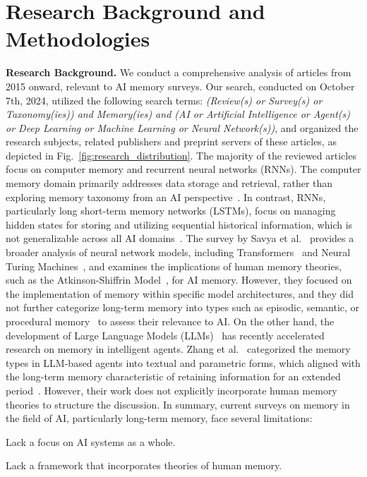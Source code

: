 \documentclass[journal,hideappendix]{vgtc}
\newenvironment{j_itemize}{
\begin{itemize}[]
  \setlength{\itemsep}{3pt}
  \setlength{\parskip}{0pt}
  \setlength{\parsep}{0pt}
}{\end{itemize}}
\begin{document}
\section{Research Background and Methodologies}
\label{sec:survey_ltm_ai}

\textbf{Research Background.} We conduct a comprehensive analysis of articles from 2015 onward, relevant to AI memory surveys. Our search, conducted on October 7th, 2024, utilized the following search terms: \textit{(Review(s) or Survey(s) or Taxonomy(ies)) and Memory(ies) and (AI or Artificial Intelligence or Agent(s) or Deep Learning or Machine Learning or Neural Network(s))}, and organized the research subjects, related publishers and preprint servers of these articles, as depicted in Fig.~\ref{fig:research_distribution}. The majority of the reviewed articles focus on computer memory and recurrent neural networks (RNNs). The computer memory domain primarily addresses data storage and retrieval, rather than exploring memory taxonomy from an AI perspective~\cite{mittal2018survey,umesh2019survey,vurdelja2020survey,radanliev2021review,qian2021graph,asad2022survey,chen2022resistive,haensch2023compute,snasel2023review,ulidowski2023saving,radhika2023review,kaur2024comprehensive,alaparthi2024survey}. In contrast, RNNs, particularly long short-term memory networks (LSTMs), focus on managing hidden states for storing and utilizing sequential historical information, which is not generalizable across all AI domains~\cite{bagherzadeh2019review,ma2019taxonomy,li2021quantitative,su2022recurrent,tan2022performance,khan2023short,ghojogh2023recurrent,tyagi2023comparative}. The survey by Savya et al.~\cite{savya2023memory} provides a broader analysis of neural network models, including Transformers~\cite{vaswani2017attention} and Neural Turing Machines~\cite{graves2014neural}, and examines the implications of human memory theories, such as the Atkinson-Shiffrin Model~\cite{atkinson1968human}, for AI memory. However, they focused on the implementation of memory within specific model architectures, and they did not further categorize long-term memory into types such as episodic, semantic, or procedural memory~\cite{tulving1985memory} to assess their relevance to AI. On the other hand, the development of Large Language Models (LLMs)~\cite{wayne2023llm} has recently accelerated research on memory in intelligent agents. Zhang et al.~\cite{zhang2024survey} categorized the memory types in LLM-based agents into textual and parametric forms, which aligned with the long-term memory characteristic of retaining information for an extended period~\cite{atkinson1968human}. However, their work does not explicitly incorporate human memory theories to structure the discussion. In summary, current surveys on memory in the field of AI, particularly long-term memory, face several limitations:
  \begin{j_itemize}
  \item[$\bullet$] Lack a focus on AI systems as a whole. 
  \item[$\bullet$] Lack a framework that incorporates theories of human memory.
  \end{j_itemize}
\end{document}

